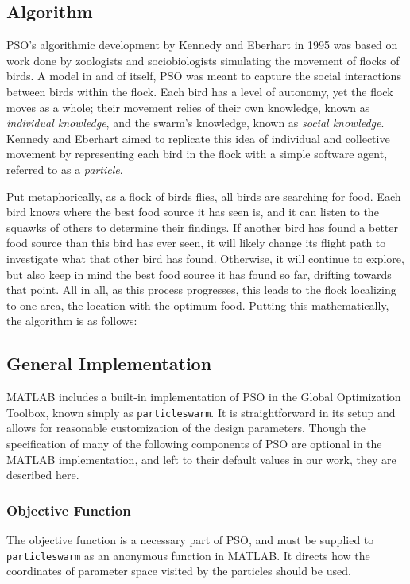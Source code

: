 \subsection{Algorithm}\label{PSO_alg}
PSO's algorithmic development by Kennedy and Eberhart in 1995 was based on work done by zoologists and sociobiologists simulating the movement of flocks of birds. A model in and of itself, PSO was meant to capture the social interactions between birds within the flock. Each bird has a level of autonomy, yet the flock moves as a whole; their movement relies of their own knowledge, known as \emph{individual knowledge}, and the swarm's knowledge, known as \emph{social knowledge}. Kennedy and Eberhart aimed to replicate this idea of individual and collective movement by representing each bird in the flock with a simple software agent, referred to as a \emph{particle}. 

\par Put metaphorically, as a flock of birds flies, all birds are searching for food. Each bird knows where the best food source it has seen is, and it can listen to the squawks of others to determine their findings. If another bird has found a better food source than this bird has ever seen, it will likely change its flight path to investigate what that other bird has found. Otherwise, it will continue to explore, but also keep in mind the best food source it has found so far, drifting towards that point. All in all, as this process progresses, this leads to the flock localizing to one area, the location with the optimum food. Putting this mathematically, the algorithm is as follows:

\subsection{General Implementation} \label{PSO_Imp}
MATLAB includes a built-in implementation of PSO in the Global Optimization Toolbox, known simply as \texttt{particleswarm}. It is straightforward in its setup and allows for reasonable customization of the design parameters. Though the specification of many of the following components of PSO are optional in the MATLAB implementation, and left to their default values in our work, they are described here. 
\subsubsection{Objective Function}
The objective function is a necessary part of PSO, and must be supplied to \texttt{particleswarm} as an anonymous function in MATLAB. It directs how the coordinates of parameter space visited by the particles should be used. 
